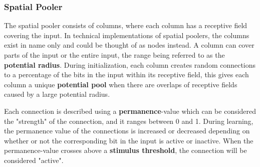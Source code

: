\subsubsection{Spatial Pooler}
The spatial pooler consists of columns, where each column has a receptive field covering the input. In technical implementations of spatial poolers, the columns exist in name only and could be thought of as nodes instead. A column can cover parts of the input or the entire input, the range being referred to as the \textbf{potential radius}. During initialization, each column creates random connections to a percentage of the bits in the input within its receptive field, this gives each column a unique \textbf{potential pool} when there are overlaps of receptive fields caused by a large potential radius.\par

Each connection is described using a \textbf{permanence}-value which can be considered the "strength" of the connection, and it ranges between 0 and 1. During learning, the permanence value of the connections is increased or decreased depending on whether or not the corresponding bit in the input is active or inactive. When the permanence-value crosses above a \textbf{stimulus threshold}, the connection will be considered "active".

